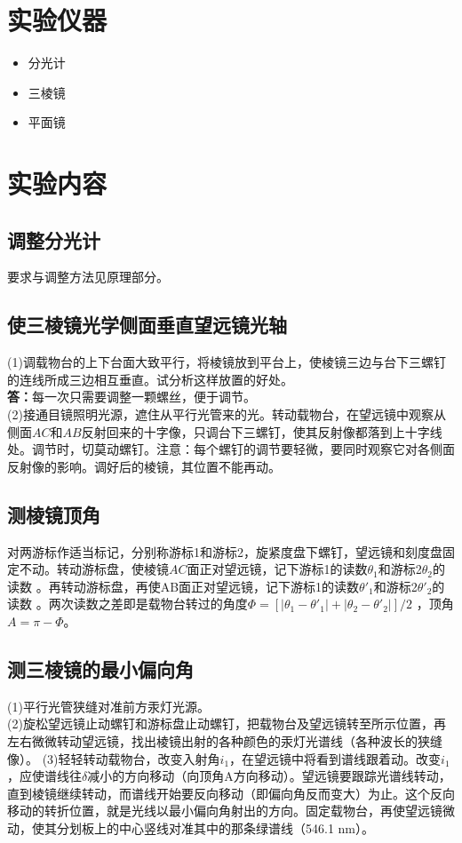 \documentclass{article}
\def\kong{\hspace*{2em}}
\begin{document}
\section{实验仪器}
    \begin{itemize}[noitemsep]
        \item 分光计
        \item 三棱镜
        \item 平面镜
    \end{itemize}
\section{实验内容}
        \subsection{调整分光计}
            \kong 要求与调整方法见原理部分。
        \subsection{使三棱镜光学侧面垂直望远镜光轴}
            \kong (1)调载物台的上下台面大致平行，将棱镜放到平台上，使棱镜三边与台下三螺钉的连线所成三边相互垂直。试分析这样放置的好处。\\
            \kong \textbf{答：}每一次只需要调整一颗螺丝，便于调节。\\
            \kong (2)接通目镜照明光源，遮住从平行光管来的光。转动载物台，在望远镜中观察从侧面$AC$和$AB$反射回来的十字像，只调台下三螺钉，使其反射像都落到上十字线处。调节时，切莫动螺钉。注意：每个螺钉的调节要轻微，要同时观察它对各侧面反射像的影响。调好后的棱镜，其位置不能再动。
        \subsection{测棱镜顶角}
            \kong 对两游标作适当标记，分别称游标1和游标2，旋紧度盘下螺钉，望远镜和刻度盘固定不动。转动游标盘，使棱镜$AC$面正对望远镜，记下游标1的读数$\theta_1$和游标2$\theta_2$的读数 。再转动游标盘，再使AB面正对望远镜，记下游标1的读数$\theta'_1$和游标2$\theta'_2$的读数 。两次读数之差即是载物台转过的角度$\Phi =[|\theta_1-\theta'_1|+|\theta_2-\theta'_2|]/2$ ，顶角$A=\pi-\Phi$。
        \subsection{测三棱镜的最小偏向角}
            \kong (1)平行光管狭缝对准前方汞灯光源。\\
            \kong (2)旋松望远镜止动螺钉和游标盘止动螺钉，把载物台及望远镜转至所示位置，再左右微微转动望远镜，找出棱镜出射的各种颜色的汞灯光谱线（各种波长的狭缝像）。
            \kong (3)轻轻转动载物台，改变入射角$i_1$，在望远镜中将看到谱线跟着动。改变$i_1$，应使谱线往$\delta $减小的方向移动（向顶角A方向移动）。望远镜要跟踪光谱线转动，直到棱镜继续转动，而谱线开始要反向移动（即偏向角反而变大）为止。这个反向移动的转折位置，就是光线以最小偏向角射出的方向。固定载物台，再使望远镜微动，使其分划板上的中心竖线对准其中的那条绿谱线（546.1 nm）。
\end{document}
